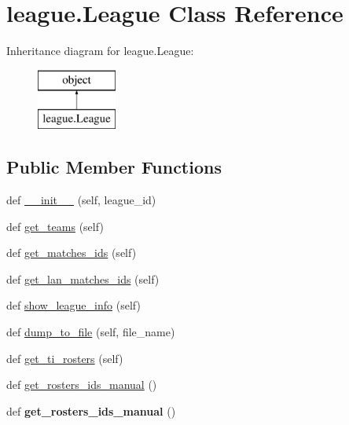 \hypertarget{classleague_1_1_league}{}\section{league.\+League Class Reference}
\label{classleague_1_1_league}
Inheritance diagram for league.\+League\+:\begin{figure}[H]
\begin{center}
\leavevmode
\includegraphics[height=2.000000cm]{classleague_1_1_league}
\end{center}
\end{figure}
\subsection*{Public Member Functions}
\begin{DoxyCompactItemize}
\item 
def \hyperlink{classleague_1_1_league_aad520cb765853c6173f9d8a9b9f92b65}{\+\_\+\+\_\+init\+\_\+\+\_\+} (self, league\+\_\+id)
\item 
def \hyperlink{classleague_1_1_league_acd15845f4b999982f4c454820a42d6c8}{get\+\_\+teams} (self)
\item 
def \hyperlink{classleague_1_1_league_a6a5d4954f2705402389247c274651f90}{get\+\_\+matches\+\_\+ids} (self)
\item 
def \hyperlink{classleague_1_1_league_aae35661491bbaf079af5b55ea161255b}{get\+\_\+lan\+\_\+matches\+\_\+ids} (self)
\item 
def \hyperlink{classleague_1_1_league_a8ee2c1b0200facaa7bdbcd975cd7034c}{show\+\_\+league\+\_\+info} (self)
\item 
def \hyperlink{classleague_1_1_league_a16576f2ee000b13680a0e3d85df22f57}{dump\+\_\+to\+\_\+file} (self, file\+\_\+name)
\item 
def \hyperlink{classleague_1_1_league_a1d8958ef5538a6fa0157d0c7c7f8f910}{get\+\_\+ti\+\_\+rosters} (self)
\item 
def \hyperlink{classleague_1_1_league_aa0799a0114eb19af4b8f40b505732636}{get\+\_\+rosters\+\_\+ids\+\_\+manual} ()
\item 
def {\bfseries get\+\_\+rosters\+\_\+ids\+\_\+manual} ()\hypertarget{classleague_1_1_league_aa0799a0114eb19af4b8f40b505732636}{}\label{classleague_1_1_league_aa0799a0114eb19af4b8f40b505732636}

\end{DoxyCompactItemize}
